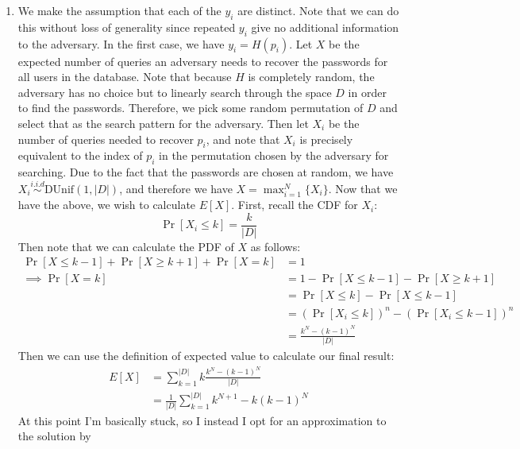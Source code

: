 \documentclass{article}
\begin{document}
\begin{enumerate}[noitemsep,topsep=\mdcompacttopsep,start=3]
\begin{enumerate}[noitemsep,topsep=\mdcompacttopsep,label=\alph*.]
\item{}We make the assumption that each of the $y_i$ are distinct. Note that 
we can do this without loss of generality since repeated $y_i$ give no additional information
to the adversary. In the first case, we have $y_i = H(p_i)$. Let $X$ be the expected number
of queries an 
adversary needs to recover the passwords for all users in the database. Note that because 
$H$ is completely random, the adversary has no choice but to linearly search through the
space $D$ in order to find the passwords. Therefore, we pick some random permutation of $D$
and select that as the search pattern for the adversary. Then let $X_i$ be the number of
queries needed to recover $p_i$, and note that $X_i$ is precisely equivalent to the index
of $p_i$ in the permutation chosen by the adversary for searching. Due to the fact that 
the passwords are chosen at random, we have $X_i \stackrel{i.i.d}{\sim} \text{DUnif}(1,|D|)$,
and therefore we have $X = \max_{i=1}^N\{ X_i \}$. Now that we have the above, we wish 
to calculate $E[X]$. First, recall the CDF for $X_i$:
\noindent\noindent\[%
\Pr[X_i \leq k ] = \frac{k}{|D|}
\]%
Then note that we can calculate the PDF of $X$ as follows:
\noindent\noindent\[%
\begin{aligned}
\Pr[X \leq k-1] + \Pr[X \geq k+1] + \Pr[X = k] &= 1 \\
\implies \Pr[X = k] &= 1 - \Pr[X \leq k - 1] - \Pr[X \geq k + 1] \\
&= \Pr[X \leq k] - \Pr[X \leq k - 1] \\
&= (\Pr[X_i \leq k])^n - (\Pr[X_i \leq k - 1])^n \\
&= \frac{k^N - (k-1)^N}{|D|}    
\end{aligned}
\]%
Then we can use the definition of expected value to calculate our final result:
\noindent\noindent\[%
\begin{aligned}
E[X] &= \sum_{k=1}^{|D|} k \frac{k^N - (k-1)^N}{|D|}   \\
&= \frac{1}{|D|} \sum_{k=1}^{|D|} k^{N+1} - k(k-1)^N 
\end{aligned}
\]%
At this point I'm basically stuck, so I instead I opt for an approximation to the solution by

\end{enumerate}
\end{enumerate}
\end{document}
